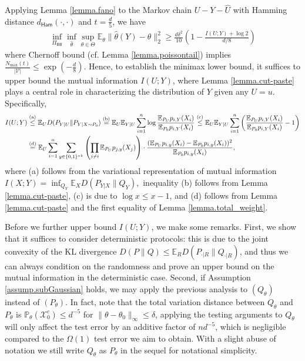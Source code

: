 \documentclass[final,12pt]{colt2018} %
\def \bP {\mathbb{P}}
\def \bE {\mathbb{E}}
\newcommand{\calV}{{\mathcal{V}}}
\newcommand{\calX}{{\mathcal{X}}}
\newcommand{\stepa}[1]{\overset{\rm (a)}{#1}}
\newcommand{\stepb}[1]{\overset{\rm (b)}{#1}}
\newcommand{\stepc}[1]{\overset{\rm (c)}{#1}}
\newcommand{\stepd}[1]{\overset{\rm (d)}{#1}}
\begin{document}
Applying Lemma \ref{lemma.fano} to the Markov chain $U-Y-\hat{U}$ with Hamming distance $d_{\mathsf{Ham}}(\cdot,\cdot)$ and $t=\frac{d}{5}$, we have
\begin{align}\label{eq.lower_bound}
\inf_{\Pi_{\mathsf{BB}}} \inf_{\hat{\theta}}\sup_{\theta\in\Theta} \bE_\theta\|\hat{\theta}(Y)-\theta\|_2^2 \ge \frac{d\delta^2}{10}\left(1 - \frac{I(U;Y)+\log 2}{d/8}\right)
\end{align}
where Chernoff bound (cf. Lemma \ref{lemma.poissontail}) implies $\frac{N_{\max}(t)}{|\calV|}\le \exp(-\frac{d}{8})$. Hence, to establish the minimax lower bound, it suffices to upper bound the mutual information $I(U;Y)$, where Lemma \ref{lemma.cut-paste} plays a central role in characterizing the distribution of $Y$ given any $U=u$. Specifically, 
\begin{align}
I(U;Y) &\stepa \le \mathbb{E}_U D(P_{Y|U}\|P_{Y|X\sim P_0}) \stepb =  \mathbb{E}_U \mathbb{E}_{Y|U} \sum_{i=1}^n\log \frac{\mathbb{E}_{P_U}p_{i,Y}(X_i) }{\mathbb{E}_{P_0}p_{i,Y}(X_i)} \stepc \le  \mathbb{E}_U \mathbb{E}_{Y|U} \sum_{i=1}^n\left(\frac{\mathbb{E}_{P_U}p_{i,Y}(X_i) }{\mathbb{E}_{P_0}p_{i,Y}(X_i)} -1 \right) \nonumber\\
&\stepd = \mathbb{E}_U \sum_{i=1}^n\sum_{y\in \{0,1\}^{nk}} \left(\prod_{j\neq i} \mathbb{E}_{P_U}p_{j,y}(X_j) \right)\cdot \frac{( \mathbb{E}_{P_U}p_{i,y}(X_i) - \mathbb{E}_{P_0}p_{i,y}(X_i) )^2 }{\mathbb{E}_{P_0}p_{i,y}(X_i)}, \label{eq.mutual_info}
\end{align}
where (a) follows from the variational representation of mutual information
$
I(X;Y) = \inf_{Q_Y} \mathbb{E}_{X} D(P_{Y|X} \| Q_Y), 
$
inequality (b) follows from Lemma \ref{lemma.cut-paste}, (c) is due to $\log x\le x-1$, and (d) follows from Lemma \ref{lemma.cut-paste} and the first equality of Lemma \ref{lemma.total_weight}. %

Before we further upper bound $I(U;Y)$, we make some remarks. First, we show that it suffices to consider deterministic protocols: this is due to the joint convexity of the KL divergence $D(P\|Q)\le \bE_R D(P_{\cdot |R} \| Q_{\cdot |R})$, and thus we can always condition on the randomness and prove an upper bound on the mutual information in the deterministic case. Second, if Assumption \ref{assump.subGaussian} holds, we may apply the previous analysis to $(Q_\theta)$ instead of $(P_\theta)$. In fact, note that the total variation distance between $Q_\theta$ and $P_\theta$ is $\bP_\theta(\calX_0^c)\le d^{-5}$ for $\|\theta-\theta_0\|_\infty \le \delta$, applying the testing arguments to $Q_\theta$ will only affect the test error by an additive factor of $nd^{-5}$, which is negligible compared to the $\Omega(1)$ test error we aim to obtain. With a slight abuse of notation we still write $Q_\theta$ as $P_\theta$ in the sequel for notational simplicity. 
\end{document}
